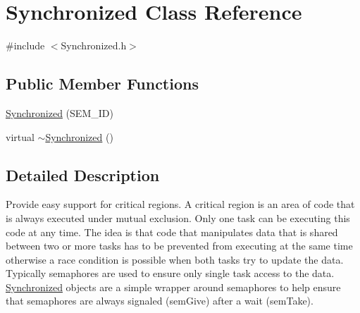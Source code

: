 \hypertarget{classSynchronized}{\section{\-Synchronized \-Class \-Reference}
\label{classSynchronized}
}


{\ttfamily \#include $<$\-Synchronized.\-h$>$}

\subsection*{\-Public \-Member \-Functions}
\begin{DoxyCompactItemize}
\item 
\hyperlink{classSynchronized_a05041c29b6ec042b9537f62e40f022fa}{\-Synchronized} (\-S\-E\-M\-\_\-\-I\-D)
\item 
virtual \hyperlink{classSynchronized_adeaa46ad24013f926eaaca662281efd3}{$\sim$\-Synchronized} ()
\end{DoxyCompactItemize}


\subsection{\-Detailed \-Description}
\-Provide easy support for critical regions. \-A critical region is an area of code that is always executed under mutual exclusion. \-Only one task can be executing this code at any time. \-The idea is that code that manipulates data that is shared between two or more tasks has to be prevented from executing at the same time otherwise a race condition is possible when both tasks try to update the data. \-Typically semaphores are used to ensure only single task access to the data. \hyperlink{classSynchronized}{\-Synchronized} objects are a simple wrapper around semaphores to help ensure that semaphores are always signaled (sem\-Give) after a wait (sem\-Take). 


